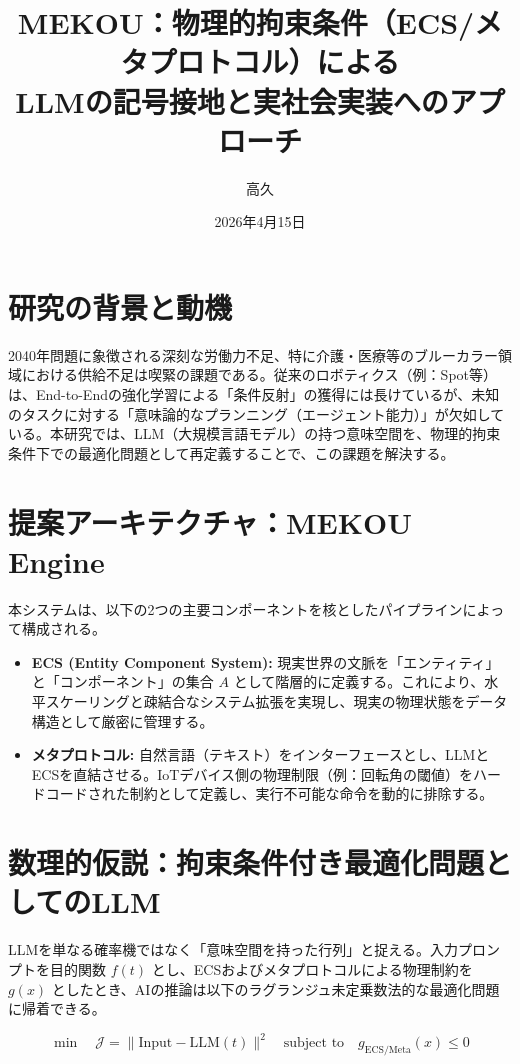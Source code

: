 \documentclass[article, 12pt]{article}
\title{MEKOU：物理的拘束条件（ECS/メタプロトコル）による\\LLMの記号接地と実社会実装へのアプローチ}
\author{高久}
\date{2026年4月15日}
\begin{document}
\maketitle

\section{研究の背景と動機}
2040年問題に象徴される深刻な労働力不足、特に介護・医療等のブルーカラー領域における供給不足は喫緊の課題である。従来のロボティクス（例：Spot等）は、End-to-Endの強化学習による「条件反射」の獲得には長けているが、未知のタスクに対する「意味論的なプランニング（エージェント能力）」が欠如している。本研究では、LLM（大規模言語モデル）の持つ意味空間を、物理的拘束条件下での最適化問題として再定義することで、この課題を解決する。

\section{提案アーキテクチャ：MEKOU Engine}
本システムは、以下の2つの主要コンポーネントを核としたパイプラインによって構成される。

\begin{itemize}
    \item \textbf{ECS (Entity Component System):} 
    現実世界の文脈を「エンティティ」と「コンポーネント」の集合 $A$ として階層的に定義する。これにより、水平スケーリングと疎結合なシステム拡張を実現し、現実の物理状態をデータ構造として厳密に管理する。
    
    \item \textbf{メタプロトコル:} 
    自然言語（テキスト）をインターフェースとし、LLMとECSを直結させる。IoTデバイス側の物理制限（例：回転角の閾値）をハードコードされた制約として定義し、実行不可能な命令を動的に排除する。
\end{itemize}

\section{数理的仮説：拘束条件付き最適化問題としてのLLM}
LLMを単なる確率機ではなく「意味空間を持った行列」と捉える。入力プロンプトを目的関数 $f(t)$ とし、ECSおよびメタプロトコルによる物理制約を $g(x)$ としたとき、AIの推論は以下のラグランジュ未定乗数法的な最適化問題に帰着できる。

\begin{equation}
\min \quad \mathcal{J} = \| \text{Input} - \text{LLM}(t) \|^2 \quad \text{subject to} \quad g_{\text{ECS/Meta}}(x) \leq 0
\end{equation}
\end{document}
